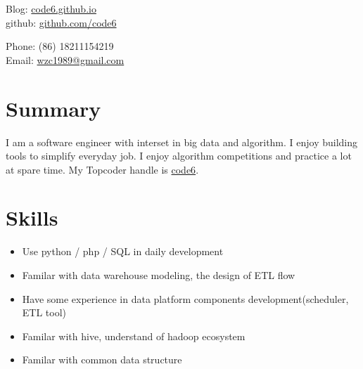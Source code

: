 \documentclass[margin,line]{res}
\newcommand{\ressection}[1]{
    {{\fontfamily{phv}\selectfont\large#1}}
}
\begin{document}


\begin{resume}

 \hspace{-1cm}
\begin{minipage}{1\linewidth}
  \begin{minipage}{0.49\linewidth}
    Blog:   \href{http://code6.github.io}{code6.github.io}\\
    github: \href{http://github.com/code6}{github.com/code6} \\
  \end{minipage}
  \hspace{\fill}
  \begin{minipage}{0.49\linewidth}
    {\Large{}}Phone: (86) 18211154219 \\
    {\Large{}}Email: \href{mailto:wzc1989@gmail.com}{wzc1989@gmail.com} \\
  \end{minipage}
\end{minipage}

\section{\ressection{Summary}}
\vspace{1cm}
I am a software engineer with interset in big data and algorithm. I enjoy building tools to simplify everyday job. I enjoy algorithm competitions and practice a lot at spare time. My Topcoder handle is \href{http://www.topcoder.com/tc?module=MemberProfile&cr=22758532}{code6}.


\section{\ressection{Skills}}
\vspace{1cm}
\begin{itemize}
\item[\ding {72}] Use python / php / SQL in daily development
\item[\ding {72}] Familar with data warehouse modeling, the design of ETL flow
\item[\ding {72}] Have some experience in data platform components development(scheduler, ETL tool)
\item[\ding {72}] Familar with hive, understand of hadoop ecosystem
\item[\ding {72}] Familar with common data structure
\end{itemize}


\end{resume}
\end{document}
